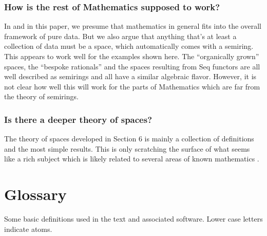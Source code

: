 \documentclass[11pt]{article}
\begin{document}
\subsubsection{How is the rest of Mathematics supposed to work?}

In \cite{PDF} and in this paper, we presume that mathematics in general fits into the overall framework of pure data.  
But we also argue that anything that's at least a collection of data must be a space, which automatically comes
with a semiring.  This appears to work well for the examples shown here.  The ``organically grown'' 
spaces, the ``bespoke rationals'' and the spaces resulting from Seq functors are all well described as semirings and 
all have a similar algebraic flavor.  However, it is not clear how well this will work for the parts of Mathematics 
which are far from the theory of semirings.

\subsubsection{Is there a deeper theory of spaces?}

The theory of spaces developed in Section 6 is mainly a collection of definitions and the most simple results.  This is only scratching 
the surface of what seems like a rich subject which is likely related to several areas of known mathematics 
\cite{golan1999,kuich1986,howie1995,semigroup,eilenberg1976,baader1998,dershowitz1990}.

\section{Glossary}
Some basic definitions used in the text and associated software\cite{coda}.  Lower case letters indicate atoms. 
\end{document}

